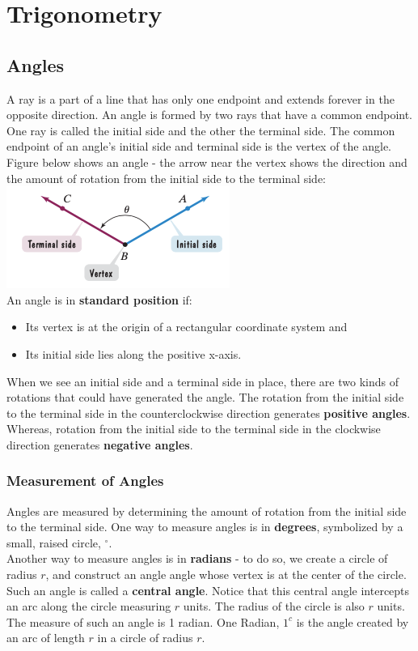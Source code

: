 \documentclass{book}
\begin{document}
	\chapter{Trigonometry}
	\section{Angles}
	 A ray is a part of a line that has only one endpoint and extends forever in the opposite direction. An angle is formed by two rays that have a common endpoint. One ray is called the initial side and the other the terminal side. The common endpoint of an angle’s initial side and terminal side is the vertex of the angle. Figure below shows an angle - the arrow near the vertex shows the direction and the amount of rotation from the initial side to the terminal side: \\
	 
	 \includegraphics[scale=0.7]{angle} \\
	 
	 An angle is in \textbf{standard position} if:
	 \begin{itemize}
		\item Its vertex is at the origin of a rectangular coordinate system and
		\item Its initial side lies along the positive x-axis.
	 \end{itemize}
	 
	 When we see an initial side and a terminal side in place, there are two kinds of rotations that could have generated the angle. The rotation from the initial side to the terminal side in the counterclockwise direction generates \textbf{positive angles}. Whereas, rotation from the initial side to the terminal side  in the clockwise direction generates \textbf{negative angles}.
	 
	 \subsection{Measurement of Angles}
	 Angles are measured by determining the amount of rotation from the initial side to the terminal side. One way to measure angles is in \textbf{degrees}, symbolized by a small, raised circle, $^\circ$.\\
	 Another way to measure angles is in \textbf{radians} - to do so, we create a circle of radius $r$, and construct an angle angle whose vertex is at the center of the circle. Such an angle is called a \textbf{central angle}. Notice that this central angle intercepts an arc along the circle measuring $r$ units. The radius of the circle is also $r$ units. The measure of such an angle is 1 radian. 
	 One Radian, $1^c$ is the angle created by an arc of length $r$ in a circle of radius $r$. \\
	  
\end{document}
